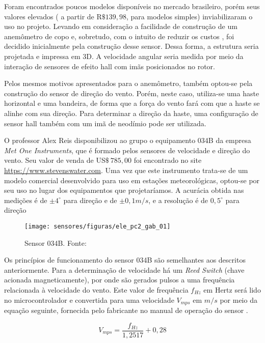 			Foram encontrados poucos modelos disponíveis no mercado brasileiro, porém seus valores elevados ( a partir de R$\$ 139,98$, para modelos simples) inviabilizaram o uso no projeto. Levando em consideração a facilidade de construção de um anemômetro de copo e, sobretudo, com o intuito de reduzir os custos , foi  decidido inicialmente pela construção desse sensor. Dessa forma, a estrutura seria projetada e impressa em 3D. A velocidade angular seria medida por meio da interação de sensores de efeito hall  com imãs posicionados no rotor.

			Pelos mesmos motivos apresentados para o anemômetro, também optou-se pela construção do sensor de direção do vento. Porém, neste caso, utiliza-se uma haste horizontal e uma bandeira, de forma que a força do vento fará com que a haste se alinhe com sua direção. Para determinar a direção da haste, uma configuração de sensor hall também com um imã de neodímio pode ser utilizada. 
			
			O professor Alex Reis disponibilizou ao grupo o equipamento 034B da empresa \emph{Met One Instruments}, que é formado pelos sensores de velocidade e direção do vento. Seu valor de venda de US$\$~785,00$  foi encontrado no site \url{https://www.stevenswater.com}. Uma vez que este instrumento trata-se de um modelo comercial desenvolvido para uso em estações meteorológicas, optou-se por seu uso no lugar dos equipamentos que projetaríamos. A acurácia obtida nas medições é de $\pm 4^{\circ}$ para direção e de $\pm 0,1 m/s$, e a resolução é de $0,5^{\circ}$ para direção 
			
			\begin{figure}
				\centering
				\texttt{[image: sensores/figuras/ele\_pc2\_gab\_01]}
				\caption{Sensor 034B. Fonte: \cite{bib_sen_gab_01}}
			\end{figure}
			
			
			
			Os princípios de funcionamento do sensor 034B são semelhantes aos descritos anteriormente. Para a determinação de velocidade há um \emph{Reed Switch} (chave acionada magneticamente), por onde são gerados pulsos a uma frequência relacionada à velocidade do vento. Este valor de frequência $f_{Hz}$ em Hertz será lido no microcontrolador e convertida para uma velocidade $V_{mps}$ em $m/s$  por meio da equação seguinte, fornecida pelo fabricante no manual de operação do sensor \cite{bib_sen_gab_02}.
			
			\begin{equation}
				V_{mps} = \frac{f_{Hz}}{1,2517} + 0,28	
			\end{equation}
			
